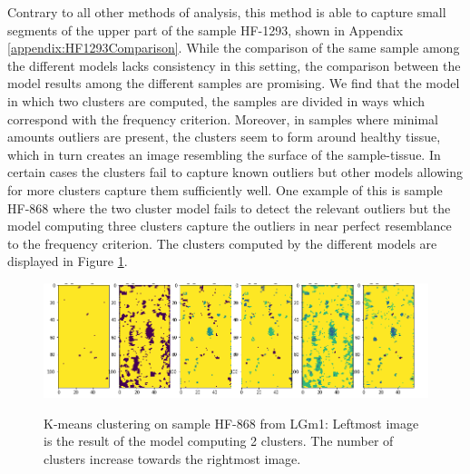 Contrary to all other methods of analysis, this method is able to capture small segments of the upper part of the sample HF-1293, shown in Appendix \ref{appendix:HF1293Comparison}. While the comparison of the same sample among the different models lacks consistency in this setting, the comparison between the model results among the different samples are promising. We find that the model in which two clusters are computed, the samples are divided in ways which correspond with the frequency criterion. Moreover, in samples where minimal amounts outliers are present, the clusters seem to form around healthy tissue, which in turn creates an image resembling the surface of the sample-tissue. In certain cases the clusters fail to capture known outliers but other models allowing for more clusters capture them sufficiently well. One example of this is sample HF-868 where the two cluster model fails to detect the relevant outliers but the model computing three clusters capture the outliers in near perfect resemblance to the frequency criterion. The clusters computed by the different models are displayed in Figure \ref{fig:KM_HF868}.

\begin{figure}[H]

    \centering
{\includegraphics[width=15cm]{images/KMeans_full/LGm-1/HF-868_1_2.h5_0.png} }
\caption{K-means clustering on sample HF-868 from LGm1: Leftmost image is the result of the model computing 2 clusters. The number of clusters increase towards the rightmost image.\label{fig:KM_HF868}}%

\end{figure}


